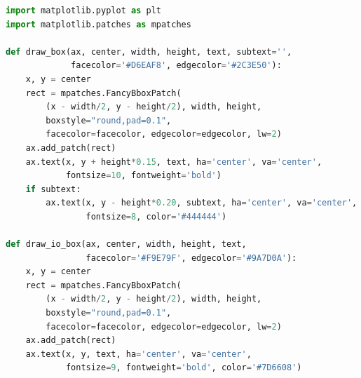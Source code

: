 \begin{lstlisting}[language=Python, caption=系统架构图生成脚本]
import matplotlib.pyplot as plt
import matplotlib.patches as mpatches

def draw_box(ax, center, width, height, text, subtext='',
             facecolor='#D6EAF8', edgecolor='#2C3E50'):
    x, y = center
    rect = mpatches.FancyBboxPatch(
        (x - width/2, y - height/2), width, height,
        boxstyle="round,pad=0.1",
        facecolor=facecolor, edgecolor=edgecolor, lw=2)
    ax.add_patch(rect)
    ax.text(x, y + height*0.15, text, ha='center', va='center',
            fontsize=10, fontweight='bold')
    if subtext:
        ax.text(x, y - height*0.20, subtext, ha='center', va='center',
                fontsize=8, color='#444444')

def draw_io_box(ax, center, width, height, text,
                facecolor='#F9E79F', edgecolor='#9A7D0A'):
    x, y = center
    rect = mpatches.FancyBboxPatch(
        (x - width/2, y - height/2), width, height,
        boxstyle="round,pad=0.1",
        facecolor=facecolor, edgecolor=edgecolor, lw=2)
    ax.add_patch(rect)
    ax.text(x, y, text, ha='center', va='center',
            fontsize=9, fontweight='bold', color='#7D6608')


\end{lstlisting}
